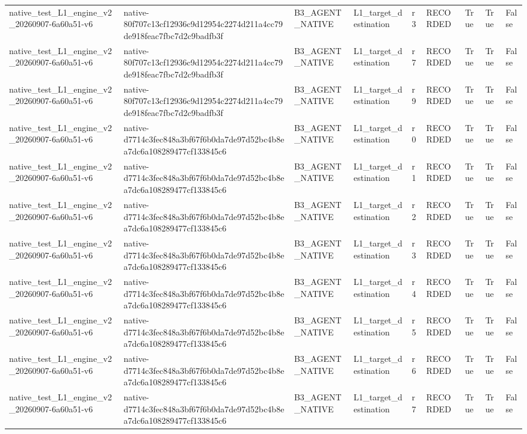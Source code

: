 \begin{tabular}{lllllllll}
native\_test\_L1\_engine\_v2\_20260907-6a60a51-v6 & native-80f707c13cf12936c9d12954c2274d211a4cc79de918feac7fbc7d2c9badfb3f & B3\_AGENT\_NATIVE & L1\_target\_destination & r3 & RECORDED & True & True & False \\
native\_test\_L1\_engine\_v2\_20260907-6a60a51-v6 & native-80f707c13cf12936c9d12954c2274d211a4cc79de918feac7fbc7d2c9badfb3f & B3\_AGENT\_NATIVE & L1\_target\_destination & r7 & RECORDED & True & True & False \\
native\_test\_L1\_engine\_v2\_20260907-6a60a51-v6 & native-80f707c13cf12936c9d12954c2274d211a4cc79de918feac7fbc7d2c9badfb3f & B3\_AGENT\_NATIVE & L1\_target\_destination & r9 & RECORDED & True & True & False \\
native\_test\_L1\_engine\_v2\_20260907-6a60a51-v6 & native-d7714c3fec848a3bf67f6b0da7de97d52bc4b8ea7dc6a108289477cf133845c6 & B3\_AGENT\_NATIVE & L1\_target\_destination & r0 & RECORDED & True & True & False \\
native\_test\_L1\_engine\_v2\_20260907-6a60a51-v6 & native-d7714c3fec848a3bf67f6b0da7de97d52bc4b8ea7dc6a108289477cf133845c6 & B3\_AGENT\_NATIVE & L1\_target\_destination & r1 & RECORDED & True & True & False \\
native\_test\_L1\_engine\_v2\_20260907-6a60a51-v6 & native-d7714c3fec848a3bf67f6b0da7de97d52bc4b8ea7dc6a108289477cf133845c6 & B3\_AGENT\_NATIVE & L1\_target\_destination & r2 & RECORDED & True & True & False \\
native\_test\_L1\_engine\_v2\_20260907-6a60a51-v6 & native-d7714c3fec848a3bf67f6b0da7de97d52bc4b8ea7dc6a108289477cf133845c6 & B3\_AGENT\_NATIVE & L1\_target\_destination & r3 & RECORDED & True & True & False \\
native\_test\_L1\_engine\_v2\_20260907-6a60a51-v6 & native-d7714c3fec848a3bf67f6b0da7de97d52bc4b8ea7dc6a108289477cf133845c6 & B3\_AGENT\_NATIVE & L1\_target\_destination & r4 & RECORDED & True & True & False \\
native\_test\_L1\_engine\_v2\_20260907-6a60a51-v6 & native-d7714c3fec848a3bf67f6b0da7de97d52bc4b8ea7dc6a108289477cf133845c6 & B3\_AGENT\_NATIVE & L1\_target\_destination & r5 & RECORDED & True & True & False \\
native\_test\_L1\_engine\_v2\_20260907-6a60a51-v6 & native-d7714c3fec848a3bf67f6b0da7de97d52bc4b8ea7dc6a108289477cf133845c6 & B3\_AGENT\_NATIVE & L1\_target\_destination & r6 & RECORDED & True & True & False \\
native\_test\_L1\_engine\_v2\_20260907-6a60a51-v6 & native-d7714c3fec848a3bf67f6b0da7de97d52bc4b8ea7dc6a108289477cf133845c6 & B3\_AGENT\_NATIVE & L1\_target\_destination & r7 & RECORDED & True & True & False \\

\end{tabular}
